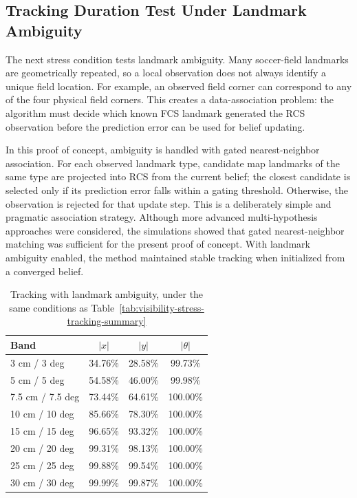 \FloatBarrier

\subsection{Tracking Duration Test Under Landmark Ambiguity}
\label{subsec:experiments-landmark-ambiguity}

The next stress condition tests landmark ambiguity. Many soccer-field landmarks are geometrically repeated, so a local observation does not always identify a unique field location. For example, an observed field corner can correspond to any of the four physical field corners. This creates a data-association problem: the algorithm must decide which known FCS landmark generated the RCS observation before the prediction error can be used for belief updating.

In this proof of concept, ambiguity is handled with gated nearest-neighbor association. For each observed landmark type, candidate map landmarks of the same type are projected into RCS from the current belief; the closest candidate is selected only if its prediction error falls within a gating threshold. Otherwise, the observation is rejected for that update step. This is a deliberately simple and pragmatic association strategy. Although more advanced multi-hypothesis approaches were considered, the simulations showed that gated nearest-neighbor matching was sufficient for the present proof of concept. With landmark ambiguity enabled, the method maintained stable tracking when initialized from a converged belief.


\begin{table}[!htbp]
    \centering
    \caption{\scriptsize Tracking with landmark ambiguity, under the same conditions as Table~\ref{tab:visibility-stress-tracking-summary}}
    \label{tab:landmark-ambiguity-tracking}
    \scriptsize
    \setlength{\tabcolsep}{5pt}
    \begin{tabular}{lccc}
        \toprule
        Band & $|x|$ & $|y|$ & $|\theta|$ \\
        \midrule
        3 cm / 3 deg & 34.76\% & 28.58\% & 99.73\% \\
        5 cm / 5 deg & 54.58\% & 46.00\% & 99.98\% \\
        7.5 cm / 7.5 deg & 73.44\% & 64.61\% & 100.00\% \\
        10 cm / 10 deg & 85.66\% & 78.30\% & 100.00\% \\
        15 cm / 15 deg & 96.65\% & 93.32\% & 100.00\% \\
        20 cm / 20 deg & 99.31\% & 98.13\% & 100.00\% \\
        25 cm / 25 deg & 99.88\% & 99.54\% & 100.00\% \\
        30 cm / 30 deg & 99.99\% & 99.87\% & 100.00\% \\
        \bottomrule
    \end{tabular}
\end{table}
\FloatBarrier
